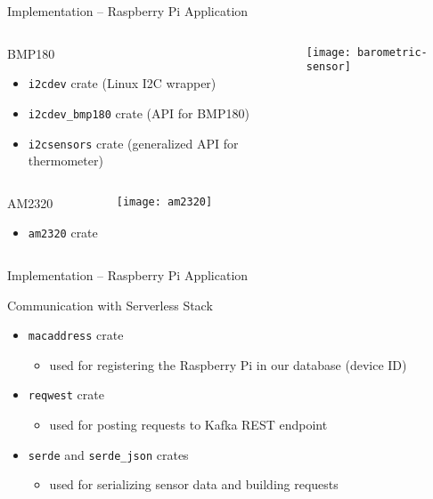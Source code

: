\begin{frame}{Implementation -- Raspberry Pi Application}
  \begin{columns}
    \begin{block}{BMP180}
      \begin{itemize}
        \item \texttt{i2cdev} crate (Linux I2C wrapper)
        \item \texttt{i2cdev\_bmp180} crate (API for BMP180)
        \item \texttt{i2csensors} crate (generalized API for thermometer)
      \end{itemize}
    \end{block}

    \vfill
    \centering
    \texttt{[image: barometric-sensor]}
  \end{columns}

  \begin{columns}
    \begin{block}{AM2320}
      \begin{itemize}
        \item \texttt{am2320} crate
      \end{itemize}
    \end{block}

    \vfill
    \centering
    \texttt{[image: am2320]}
  \end{columns}
\end{frame}

\begin{frame}{Implementation -- Raspberry Pi Application}
  \begin{block}{Communication with Serverless Stack}
    \begin{itemize}
      \item \texttt{macaddress} crate
        \begin{itemize}
          \item used for registering the Raspberry Pi in our database (device ID)
        \end{itemize}
      \item \texttt{reqwest} crate
        \begin{itemize}
          \item used for posting requests to Kafka REST endpoint
        \end{itemize}
      \item \texttt{serde} and \texttt{serde\_json} crates
        \begin{itemize}
          \item used for serializing sensor data and building requests
        \end{itemize}
    \end{itemize}
  \end{block}
\end{frame}

